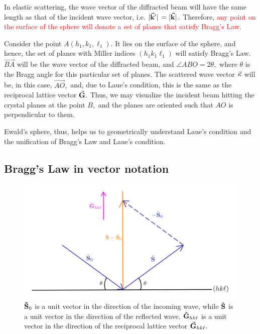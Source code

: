 	In elastic scattering, the wave vector of the diffracted beam will have the same length as that of the incident wave vector, i.e. $\abs*{\va{k}'} = \abs*{\va{k}}.$  Therefore, \textcolor{red}{any point on the surface of the sphere will denote a set of planes that satisfy Bragg's Law}.
	
	Consider the point $A(h_1, k_1, \ell_1).$ It lies on the surface of the sphere, and hence, the set of planes with Miller indices $(h_1 k_1 \ell_1)$ will satisfy Bragg's Law. $\overrightarrow{BA}$ will be the wave vector of the diffracted beam, and $\angle ABO = 2\theta,$ where $\theta$ is the Bragg angle for this particular set of planes. The scattered wave vector $\va{\kappa}$ will be, in this case, $\overrightarrow{AO},$ and, due to Laue's condition, this is the same as the reciprocal lattice vector $\va{G}.$ Thus, we may visualize the incident beam hitting the crystal planes at the point $B,$ and the planes are oriented such that $AO$ is perpendicular to them.
	
	Ewald's sphere, thus, helps us to geometrically understand Laue's condition and the unification of Bragg's Law and Laue's condition.
	

\subsection{Bragg's Law in vector notation}

\begin{figure}
	\centering
	\includegraphics[scale=0.2]{bragg_law_vector.png}
	\caption{\label{fig:bragg_law_vector}$\vu{S}_0$ is a unit vector in the direction of the incoming wave, while $\vu{S}$ is a unit vector in the direction of the reflected wave. $\vu{G}_{hk\ell}$ is a unit vector in the direction of the reciprocal lattice vector $\va{G}_{hk\ell}.$}
\end{figure}

